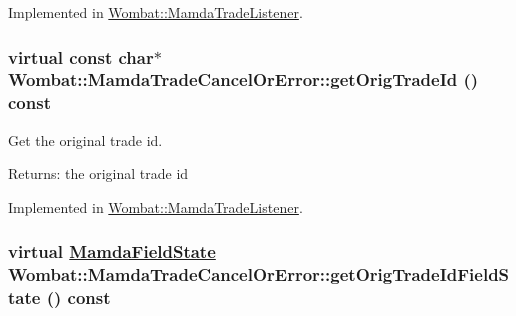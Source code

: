 Implemented in \hyperlink{classWombat_1_1MamdaTradeListener_98bb7d4f99af6f7b565506fb9b79665d}{Wombat::Mamda\-Trade\-Listener}.\hypertarget{classWombat_1_1MamdaTradeCancelOrError_77edcaedced6b03219438ef4b2bcef68}{
\subsubsection[getOrigTradeId]{\setlength{\rightskip}{0pt plus 5cm}virtual const char$\ast$ Wombat::Mamda\-Trade\-Cancel\-Or\-Error::get\-Orig\-Trade\-Id () const}}
\label{classWombat_1_1MamdaTradeCancelOrError_77edcaedced6b03219438ef4b2bcef68}


Get the original trade id. 

\begin{Desc}
\item[Returns:]the original trade id \end{Desc}


Implemented in \hyperlink{classWombat_1_1MamdaTradeListener_f63f45ca9303c611b885390a012d6b87}{Wombat::Mamda\-Trade\-Listener}.\hypertarget{classWombat_1_1MamdaTradeCancelOrError_ed7b73cb88b3c9813bbe7a79e1a25c87}{
\subsubsection[getOrigTradeIdFieldState]{\setlength{\rightskip}{0pt plus 5cm}virtual \hyperlink{namespaceWombat_93aac974f2ab713554fd12a1fa3b7d2a}{Mamda\-Field\-State} Wombat::Mamda\-Trade\-Cancel\-Or\-Error::get\-Orig\-Trade\-Id\-Field\-State () const}}
\label{classWombat_1_1MamdaTradeCancelOrError_ed7b73cb88b3c9813bbe7a79e1a25c87}




